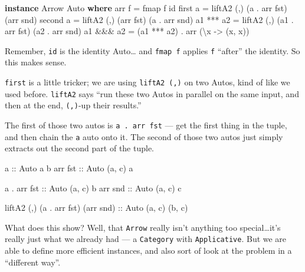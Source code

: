 \documentclass[]{article}
\newenvironment{Shaded}{}{}
\newcommand{\KeywordTok}[1]{\textcolor[rgb]{0.00,0.44,0.13}{\textbf{{#1}}}}
\newcommand{\DataTypeTok}[1]{\textcolor[rgb]{0.56,0.13,0.00}{{#1}}}
\newcommand{\OtherTok}[1]{\textcolor[rgb]{0.00,0.44,0.13}{{#1}}}
\newcommand{\FunctionTok}[1]{\textcolor[rgb]{0.02,0.16,0.49}{{#1}}}
\newcommand{\NormalTok}[1]{{#1}}
\begin{document}
\begin{Shaded}
\begin{Highlighting}[]
\KeywordTok{instance} \DataTypeTok{Arrow} \DataTypeTok{Auto} \KeywordTok{where}
    \NormalTok{arr f     }\FunctionTok{=} \NormalTok{fmap f id}
    \NormalTok{first a   }\FunctionTok{=} \NormalTok{liftA2 (,) (a  }\FunctionTok{.} \NormalTok{arr fst) (arr snd)}
    \NormalTok{second a  }\FunctionTok{=} \NormalTok{liftA2 (,) (arr fst)      (a  }\FunctionTok{.} \NormalTok{arr snd)}
    \NormalTok{a1 }\FunctionTok{***} \NormalTok{a2 }\FunctionTok{=} \NormalTok{liftA2 (,) (a1 }\FunctionTok{.} \NormalTok{arr fst) (a2 }\FunctionTok{.} \NormalTok{arr snd)}
    \NormalTok{a1 }\FunctionTok{&&&} \NormalTok{a2 }\FunctionTok{=} \NormalTok{(a1 }\FunctionTok{***} \NormalTok{a2) }\FunctionTok{.} \NormalTok{arr (\textbackslash{}x }\OtherTok{->} \NormalTok{(x, x))}
\end{Highlighting}
\end{Shaded}

Remember, \texttt{id} is the identity Auto\ldots{} and \texttt{fmap\ f}
applies \texttt{f} ``after'' the identity. So this makes sense.

\texttt{first} is a little tricker; we are using \texttt{liftA2\ (,)} on
two Autos, kind of like we used before. \texttt{liftA2} says ``run these
two Autos in parallel on the same input, and then at the end,
\texttt{(,)}-up their results.''

The first of those two autos is \texttt{a\ .\ arr\ fst} --- get the
first thing in the tuple, and then chain the \texttt{a} auto onto it.
The second of those two autos just simply extracts out the second part
of the tuple.

\begin{Shaded}
\begin{Highlighting}[]
\OtherTok{a           ::} \DataTypeTok{Auto} \NormalTok{a b}
\NormalTok{arr}\OtherTok{ fst     ::} \DataTypeTok{Auto} \NormalTok{(a, c) a}

\NormalTok{a }\FunctionTok{.} \NormalTok{arr}\OtherTok{ fst ::} \DataTypeTok{Auto} \NormalTok{(a, c) b}
\NormalTok{arr}\OtherTok{ snd     ::} \DataTypeTok{Auto} \NormalTok{(a, c) c}

\NormalTok{liftA2 (,) (a }\FunctionTok{.} \NormalTok{arr fst) (arr snd)}\OtherTok{ ::} \DataTypeTok{Auto} \NormalTok{(a, c) (b, c)}
\end{Highlighting}
\end{Shaded}

What does this show? Well, that \texttt{Arrow} really isn't anything too
special\ldots{}it's really just what we already had --- a
\texttt{Category} with \texttt{Applicative}. But we are able to define
more efficient instances, and also sort of look at the problem in a
``different way''.
\end{document}

